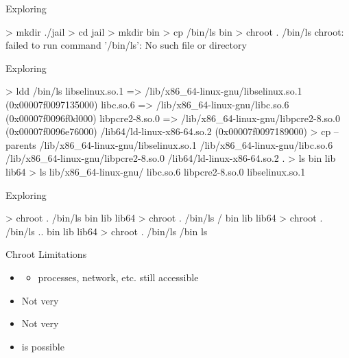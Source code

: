 \documentclass{slide}
\begin{document}

\begin{frame}[fragile]{Exploring }
    \begin{code}[numbers=none]{}
> mkdir ./jail
> cd jail
> mkdir bin
> cp /bin/ls bin
> chroot . /bin/ls
chroot: failed to run command '/bin/ls': No such file or directory
    \end{code}
\end{frame}

\begin{frame}[fragile]{Exploring }
    \vspace{-0.5em}
    \begin{code}[numbers=none]{}
> ldd /bin/ls
    libselinux.so.1 => /lib/x86_64-linux-gnu/libselinux.so.1 (0x00007f0097135000)
    libc.so.6 => /lib/x86_64-linux-gnu/libc.so.6 (0x00007f0096f0d000)
    libpcre2-8.so.0 => /lib/x86_64-linux-gnu/libpcre2-8.so.0 (0x00007f0096e76000)
    /lib64/ld-linux-x86-64.so.2 (0x00007f0097189000)
> cp --parents /lib/x86_64-linux-gnu/libselinux.so.1 /lib/x86_64-linux-gnu/libc.so.6 /lib/x86_64-linux-gnu/libpcre2-8.so.0 /lib64/ld-linux-x86-64.so.2 .
> ls
bin  lib  lib64
> ls lib/x86_64-linux-gnu/
libc.so.6  libpcre2-8.so.0  libselinux.so.1
    \end{code}
\end{frame}

\begin{frame}[fragile]{Exploring }
    \begin{code}[numbers=none]{}
> chroot . /bin/ls
bin  lib  lib64
> chroot . /bin/ls /
bin  lib  lib64
> chroot . /bin/ls ..
bin  lib  lib64
> chroot . /bin/ls /bin
ls
    \end{code}
\end{frame}

\begin{frame}[fragile]{Chroot Limitations}
    {\LARGE
    \begin{itemize}
        \item {}
        \begin{itemize}
            \Large \item processes, network, etc. still accessible
        \end{itemize}
        \item Not very 
        \item Not very 
        \item {} is possible
    \end{itemize}
    }
\end{frame}
\end{document}
